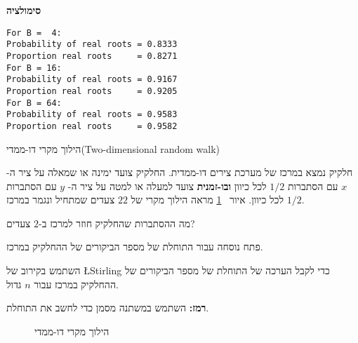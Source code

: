 \textbf{סימולציה}
\begin{verbatim}
For B =  4:
Probability of real roots = 0.8333
Proportion real roots     = 0.8271
For B = 16:
Probability of real roots = 0.9167
Proportion real roots     = 0.9205
For B = 64:
Probability of real roots = 0.9583
Proportion real roots     = 0.9582
\end{verbatim}


\begin{prob}{הילוך מקרי דו-ממדי}{}{(Two-dimensional random walk)}

חלקיק נמצא במרכז של מערכת צירים דו-ממדית. החלקיק צועד ימינה או שמאלה על ציר ה-%
$x$
עם הסתברות 
$1/2$
לכל כיוון 
\textbf{ובו-זמנית}
צועד למעלה או למטה על ציר ה-%
$y$
עם הסתברות 
$1/2$
לכל כיוון. איור%
~\ref{f.2d-random-walk}
מראה הילוך מקרי של 
$22$
צעדים שמתחיל ונגמר במרכז.

מה ההסתברות שהחלקיק חוזר למרכז ב-$2$ צעדים?

פתח נוסחה עבור התוחלת של מספר הביקורים של ההחלקיק במרכז.

השתמש בקירוב של
\L{Stirling}
כדי לקבל הערכה של התוחלת של מספר הביקורים של ההחלקיק במרכז עבור $n$ גדול.

\textbf{רמז:}
השתמש במשתנה מסמן כדי לחשב את התוחלת.
\begin{figure}[t]
\begin{center}
\end{center}
\caption{הילוך מקרי דו-ממדי}\label{f.2d-random-walk}
\end{figure}
\end{prob}

